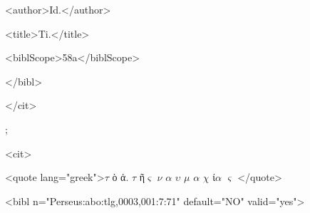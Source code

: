 \documentclass[10pt]{article}
\begin{document}
\begin{adjustwidth}{1.12in}{0.0in}
 <author>Id.</author>\par

\end{adjustwidth}

\begin{adjustwidth}{1.12in}{0.0in}
 <title>Ti.</title>\par

\end{adjustwidth}

\begin{adjustwidth}{1.12in}{0.0in}
 <biblScope>58a</biblScope>\par

\end{adjustwidth}

\begin{adjustwidth}{0.99in}{0.0in}
 </bibl>\par

\end{adjustwidth}

\begin{adjustwidth}{0.85in}{0.0in}
 </cit>\par

\end{adjustwidth}

\begin{adjustwidth}{0.85in}{0.0in}
 ;\par

\end{adjustwidth}

\begin{adjustwidth}{0.85in}{0.0in}
 <cit>\par

\end{adjustwidth}

\begin{adjustwidth}{0.99in}{0.0in}
 <quote lang="greek">$ \tau$ ὸ ἀ. $ \tau$ ῆ$ \varsigma $  $ \nu $ $ \alpha $ $ \upsilon $ $ \mu $ $ \alpha $ $ \chi $ ί$ \alpha $ $ \varsigma $ </quote>\par

\end{adjustwidth}

\begin{adjustwidth}{0.99in}{0.0in}
 <bibl n="Perseus:abo:tlg,0003,001:7:71" default="NO" valid="yes">\par

\end{adjustwidth}
\end{document}
